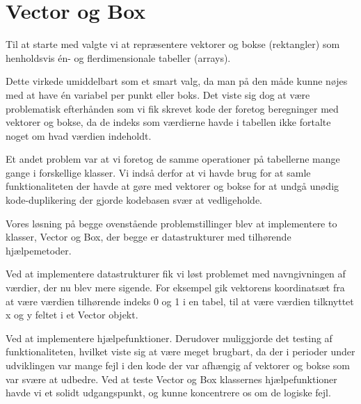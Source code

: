 \section{Vector og Box}

Til at starte med valgte vi at repræsentere vektorer og bokse (rektangler) som henholdsvis én- og flerdimensionale tabeller (arrays).

Dette virkede umiddelbart som et smart valg, da man på den måde kunne nøjes med at have én variabel per punkt eller boks. Det viste sig dog at være problematisk efterhånden som vi fik skrevet kode der foretog beregninger med vektorer og bokse, da de indeks som værdierne havde i tabellen ikke fortalte noget om hvad værdien indeholdt.

Et andet problem var at vi foretog de samme operationer på tabellerne mange gange i forskellige klasser. Vi indså derfor at vi havde brug for at samle funktionaliteten der havde at gøre med vektorer og bokse for at undgå unødig kode-duplikering der gjorde kodebasen svær at vedligeholde.

Vores løsning på begge ovenstående problemstillinger blev at implementere to klasser, Vector og Box, der begge er datastrukturer med tilhørende hjælpemetoder.

Ved at implementere datastrukturer fik vi løst problemet med navngivningen af værdier, der nu blev mere sigende. For eksempel gik vektorens koordinatsæt fra at være værdien tilhørende indeks 0 og 1 i en tabel, til at være værdien tilknyttet x og y feltet i et Vector objekt.

Ved at implementere hjælpefunktioner. Derudover muliggjorde det testing af funktionaliteten, hvilket viste sig at være meget brugbart, da der i perioder under udviklingen var mange fejl i den kode der var afhængig af vektorer og bokse som var svære at udbedre. Ved at teste Vector og Box klassernes hjælpefunktioner havde vi et solidt udgangspunkt, og kunne koncentrere os om de logiske fejl.

